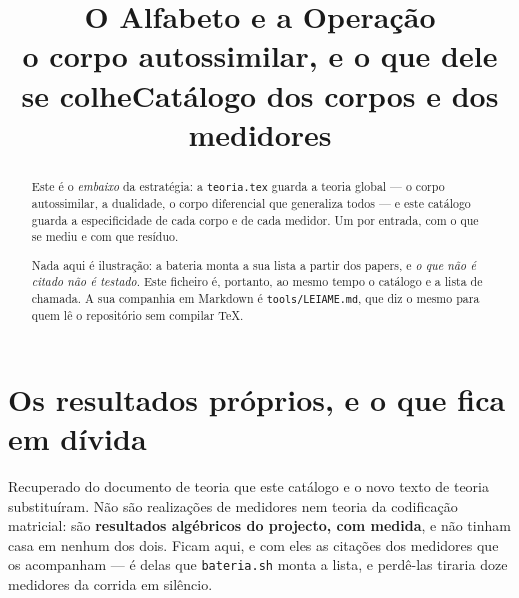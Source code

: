 \documentclass[11pt]{article}
\title{\textbf{O Alfabeto e a Operação}\\[3pt]
\large o corpo autossimilar, e o que dele se colhe}
\author{}\date{}
\newcommand{\code}[1]{\texttt{\small #1}}
\theoremstyle{plain}
\theoremstyle{remark}
\begin{document}
\title{Catálogo dos corpos e dos medidores}
\author{}
\date{}
\maketitle

\begin{abstract}
Este é o \emph{embaixo} da estratégia: a \code{teoria.tex} guarda a teoria global --- o corpo
autossimilar, a dualidade, o corpo diferencial que generaliza todos --- e este catálogo guarda a
especificidade de cada corpo e de cada medidor. Um por entrada, com o que se mediu e com que
resíduo.

Nada aqui é ilustração: a bateria monta a sua lista a partir dos papers, e \emph{o que não é
citado não é testado}. Este ficheiro é, portanto, ao mesmo tempo o catálogo e a lista de
chamada. A sua companhia em Markdown é \code{tools/LEIAME.md}, que diz o mesmo para quem lê o
repositório sem compilar \TeX.
\end{abstract}

\tableofcontents
\bigskip


\part{Os resultados próprios, e o que fica em dívida}\label{part:resultados}

Recuperado do documento de teoria que este catálogo e o novo texto de teoria substituíram.
Não são realizações de medidores nem teoria da codificação matricial: são \textbf{resultados
algébricos do projecto, com medida}, e não tinham casa em nenhum dos dois. Ficam aqui, e com
eles as citações dos medidores que os acompanham --- é delas que \code{bateria.sh} monta a
lista, e perdê-las tiraria doze medidores da corrida em silêncio.
\end{document}

